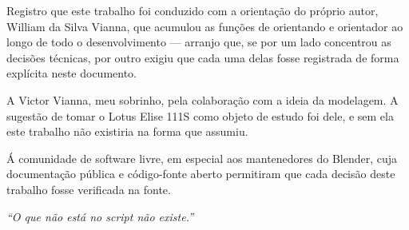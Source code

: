 \noindent
Registro que este trabalho foi conduzido com a orienta\c{c}\~ao do pr\'oprio autor, William da
Silva Vianna, que acumulou as fun\c{c}\~oes de orientando e orientador ao longo de todo o
desenvolvimento --- arranjo que, se por um lado concentrou as decis\~oes t\'ecnicas, por outro
exigiu que cada uma delas fosse registrada de forma expl\'icita neste documento.

\noindent
A Victor Vianna, meu sobrinho, pela colabora\c{c}\~ao com a ideia da modelagem. A sugest\~ao de
tomar o Lotus Elise 111S como objeto de estudo foi dele, e sem ela este trabalho n\~ao
existiria na forma que assumiu.

\noindent
\'A comunidade de software livre, em especial aos mantenedores do Blender, cuja
documenta\c{c}\~ao p\'ublica e c\'odigo-fonte aberto permitiram que cada decis\~ao deste
trabalho fosse verificada na fonte.

\vspace{1.0cm}
\clearpage

\thispagestyle{empty}
\vspace*{\fill}
\begin{flushright}
  \begin{minipage}{0.55\textwidth}
    \SingleSpacing
    \itshape
    ``O que n\~ao est\'a no script n\~ao existe.''
  \end{minipage}
\end{flushright}
\vspace*{\fill}
\clearpage
